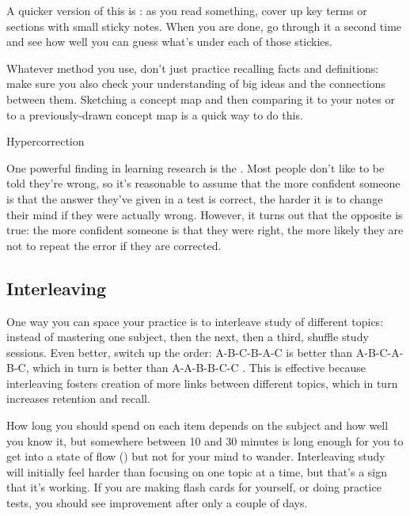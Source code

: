 A quicker version of this is
: as you read
something, cover up key terms or sections with small sticky notes.
When you are done, go through it a second time and see how well you
can guess what's under each of those stickies.

Whatever method you use, don't just practice recalling facts and
definitions: make sure you also check your understanding of big ideas
and the connections between them.  Sketching a concept map and then
comparing it to your notes or to a previously-drawn concept map is a
quick way to do this.

\begin{callout}{Hypercorrection}

  One powerful finding in learning research is the
  \cite{Metc2016}.  Most people don't like to be told they're wrong,
  so it's reasonable to assume that the more confident someone is that
  the answer they've given in a test is correct, the harder it is to
  change their mind if they were actually wrong.  However, it turns
  out that the opposite is true: the more confident someone is that
  they were right, the more likely they are not to repeat the error if
  they are corrected.

\end{callout}

\subsection*{Interleaving}

One way you can space your practice is to interleave study of
different topics: instead of mastering one subject, then the next,
then a third, shuffle study sessions.  Even better, switch up the
order: A-B-C-B-A-C is better than A-B-C-A-B-C, which in turn is better
than A-A-B-B-C-C \cite{Rohrer2015}.  This is effective because
interleaving fosters creation of more links between different topics,
which in turn increases retention and recall.

How long you should spend on each item depends on the subject and how
well you know it, but somewhere between 10 and 30 minutes is long
enough for you to get into a state of flow
() but not for your mind to wander.
Interleaving study will initially feel harder than focusing on one
topic at a time, but that's a sign that it's working.  If you are
making flash cards for yourself, or doing practice tests, you should
see improvement after only a couple of days.

